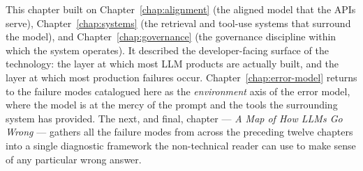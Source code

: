 This chapter built on Chapter~\ref{chap:alignment} (the aligned model that the
APIs serve), Chapter~\ref{chap:systems} (the retrieval and tool-use systems
that surround the model), and Chapter~\ref{chap:governance} (the governance
discipline within which the system operates). It described
the developer-facing surface of the technology: the layer at
which most LLM products are actually built, and the layer at
which most production failures occur. Chapter~\ref{chap:error-model} returns to
the failure modes catalogued here as the \emph{environment}
axis of the error model, where the model is at the mercy of
the prompt and the tools the surrounding system has provided.
The next, and final, chapter --- \emph{A Map of How LLMs Go
Wrong} --- gathers all the failure modes from across the
preceding twelve chapters into a single diagnostic framework
the non-technical reader can use to make sense of any
particular wrong answer.
